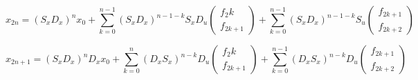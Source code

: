 \documentclass[10pt,a4paper]{article}
\begin{document}
\begin{equation}
x_{2n}=
(S_xD_x)^nx_0+
\sum\limits_{k=0}^{n-1}{(S_xD_x)^{n-1-k}}S_xD_u
\begin{pmatrix} f_2k \\ f_{2k+1} \end{pmatrix}+
\sum\limits_{k=0}^{n-1}{(S_xD_x)^{n-1-k}}S_u
\begin{pmatrix} f_{2k+1} \\ f_{2k+2} \end{pmatrix}
\end{equation}

\begin{equation}
x_{2n+1}=
(S_xD_x)^nD_xx_0+
\sum\limits_{k=0}^{n}{(D_xS_x)^{n-k}}D_u
\begin{pmatrix} f_2k \\ f_{2k+1} \end{pmatrix}+
\sum\limits_{k=0}^{n-1}{(D_xS_x)^{n-k}}D_u
\begin{pmatrix} f_{2k+1} \\ f_{2k+2} \end{pmatrix}
\end{equation}
\end{document}
